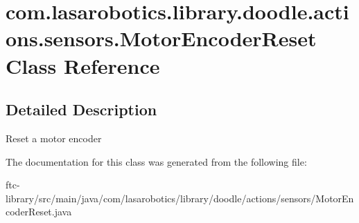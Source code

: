 \hypertarget{classcom_1_1lasarobotics_1_1library_1_1doodle_1_1actions_1_1sensors_1_1_motor_encoder_reset}{}\section{com.\+lasarobotics.\+library.\+doodle.\+actions.\+sensors.\+Motor\+Encoder\+Reset Class Reference}
\label{classcom_1_1lasarobotics_1_1library_1_1doodle_1_1actions_1_1sensors_1_1_motor_encoder_reset}


\subsection{Detailed Description}
Reset a motor encoder 

The documentation for this class was generated from the following file\+:\begin{DoxyCompactItemize}
\item 
ftc-\/library/src/main/java/com/lasarobotics/library/doodle/actions/sensors/Motor\+Encoder\+Reset.\+java\end{DoxyCompactItemize}
